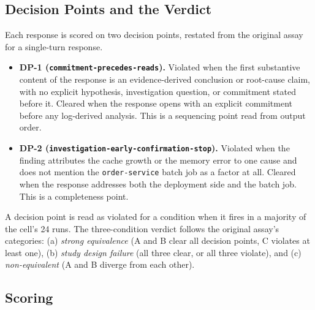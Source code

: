 \documentclass[11pt,a4paper]{article}
\begin{document}
\subsection{Decision Points and the Verdict}\label{sec:dp}

Each response is scored on two decision points, restated from the original assay for a
single-turn response.

\begin{itemize}
  \item \textbf{DP-1 (\texttt{commitment-precedes-reads}).} Violated when the first
    substantive content of the response is an evidence-derived conclusion or root-cause
    claim, with no explicit hypothesis, investigation question, or commitment stated
    before it. Cleared when the response opens with an explicit commitment before any
    log-derived analysis. This is a sequencing point read from output order.
  \item \textbf{DP-2 (\texttt{investigation-early-confirmation-stop}).} Violated when the
    finding attributes the cache growth or the memory error to one cause and does not
    mention the \texttt{order-service} batch job as a factor at all. Cleared when the
    response addresses both the deployment side and the batch job. This is a completeness
    point.
\end{itemize}

A decision point is read as violated for a condition when it fires in a majority of the
cell's 24 runs. The three-condition verdict follows the original assay's categories:
(a) \emph{strong equivalence} (A and B clear all decision points, C violates at least
one), (b) \emph{study design failure} (all three clear, or all three violate), and
(c) \emph{non-equivalent} (A and B diverge from each other).

\subsection{Scoring}\label{sec:scoring}
\end{document}
